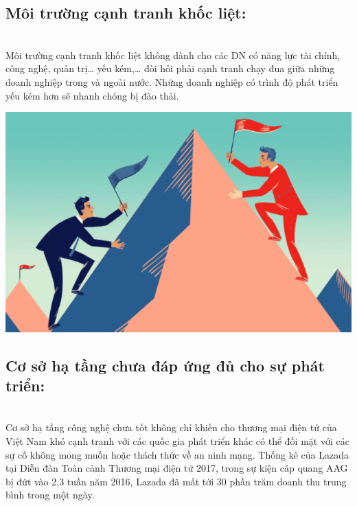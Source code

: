 \documentclass[13pt,a4paper]{article}
\begin{document}
    \subsection{Môi trường cạnh tranh khốc liệt:}\\
     Môi trường cạnh tranh khốc liệt không dành cho các DN có năng lực tài chính, công nghệ, quản trị… yếu kém,… đòi hỏi phải cạnh tranh chạy đua giữa những doanh nghiệp trong và ngoài nước. Những doanh nghiệp có trình độ phát triển yếu kém hơn sẽ nhanh chóng bị đào thải. 
     \begin{center}
    \includegraphics[scale=0.8]{images/thach.png} \\
    \fontsize{10pt}{1.2pt}\selectfont
    \end{center}
    \subsection{Cơ sở hạ tầng chưa đáp ứng đủ cho sự phát triển:}\\
    Cơ sở hạ tầng công nghệ chưa tốt không chỉ khiến cho thương mại điện tử của Việt Nam khó cạnh tranh với các quốc gia phát triển khác có thể đối mặt với các sự cố không mong muốn hoặc thách thức về an ninh mạng. Thống kê của Lazada tại Diễn đàn Toàn cảnh Thương mại điện tử 2017, trong sự kiện cáp quang AAG bị đứt vào 2,3 tuần năm 2016, Lazada đã mất tới 30 phần trăm doanh thu trung bình trong một ngày.
\end{document}

